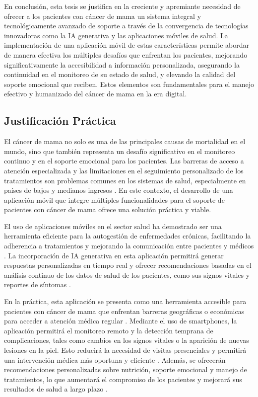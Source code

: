 En conclusión, esta tesis se justifica en la creciente y apremiante necesidad de ofrecer a los pacientes con cáncer de mama un sistema integral y tecnológicamente avanzado de soporte a través de la convergencia de tecnologías innovadoras como la IA generativa y las aplicaciones móviles de salud. La implementación de una aplicación móvil de estas características permite abordar de manera efectiva los múltiples desafíos que enfrentan los pacientes, mejorando significativamente la accesibilidad a información personalizada, asegurando la continuidad en el monitoreo de su estado de salud, y elevando la calidad del soporte emocional que reciben. Estos elementos son fundamentales para el manejo efectivo y humanizado del cáncer de mama en la era digital.


\subsection{Justificación Práctica}
El cáncer de mama no solo es una de las principales causas de mortalidad en el mundo, sino que también representa un desafío significativo en el monitoreo continuo y en el soporte emocional para los pacientes. Las barreras de acceso a atención especializada y las limitaciones en el seguimiento personalizado de los tratamientos son problemas comunes en los sistemas de salud, especialmente en países de bajos y medianos ingresos \parencite{pascucci2021}. En este contexto, el desarrollo de una aplicación móvil que integre múltiples funcionalidades para el soporte de pacientes con cáncer de mama ofrece una solución práctica y viable.

El uso de aplicaciones móviles en el sector salud ha demostrado ser una herramienta eficiente para la autogestión de enfermedades crónicas, facilitando la adherencia a tratamientos y mejorando la comunicación entre pacientes y médicos \parencite{okolo2024}. La incorporación de IA generativa en esta aplicación permitirá generar respuestas personalizadas en tiempo real y ofrecer recomendaciones basadas en el análisis continuo de los datos de salud de los pacientes, como sus signos vitales y reportes de síntomas \parencite{ce2024}.

En la práctica, esta aplicación se presenta como una herramienta accesible para pacientes con cáncer de mama que enfrentan barreras geográficas o económicas para acceder a atención médica regular \parencite{leung2022}. Mediante el uso de smartphones, la aplicación permitirá el monitoreo remoto y la detección temprana de complicaciones, tales como cambios en los signos vitales o la aparición de nuevas lesiones en la piel. Esto reducirá la necesidad de visitas presenciales y permitirá una intervención médica más oportuna y eficiente \parencite{masciantonio2017}. Además, se ofrecerán recomendaciones personalizadas sobre nutrición, soporte emocional y manejo de tratamientos, lo que aumentará el compromiso de los pacientes y mejorará sus resultados de salud a largo plazo \parencite{beltran2023}.

